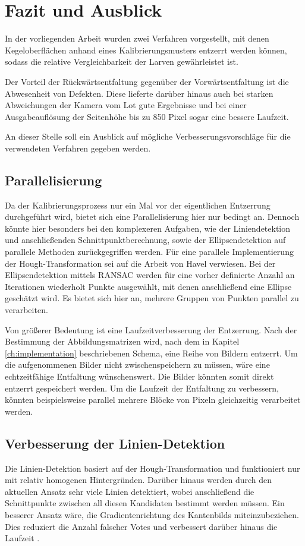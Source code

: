 \chapter{Fazit und Ausblick}
\label{ch:summary}
In der vorliegenden Arbeit wurden zwei Verfahren vorgestellt, mit denen Kegeloberflächen anhand eines Kalibrierungsmusters entzerrt werden können, sodass die relative Vergleichbarkeit der Larven gewährleistet ist.

Der Vorteil der Rückwärtsentfaltung gegenüber der Vorwärtsentfaltung ist die Abwesenheit von Defekten. Diese lieferte darüber hinaus auch bei starken Abweichungen der Kamera vom Lot gute Ergebnisse und bei einer Ausgabeauflösung der Seitenhöhe bis zu 850 Pixel sogar eine bessere Laufzeit.

An dieser Stelle soll ein Ausblick auf mögliche Verbesserungsvorschläge für die verwendeten Verfahren gegeben werden.

\section{Parallelisierung}
Da der Kalibrierungsprozess nur ein Mal vor der eigentlichen Entzerrung durchgeführt wird, bietet sich eine Parallelisierung hier nur bedingt an.
Dennoch könnte hier besonders bei den komplexeren Aufgaben, wie der Liniendetektion und anschließenden Schnittpunktberechnung, sowie der Ellipsendetektion auf parallele Methoden zurückgegriffen werden.
Für eine parallele Implementierung der Hough-Transformation sei auf die Arbeit von Havel \cite{Havel2014} verwiesen.
Bei der Ellipsendetektion mittels RANSAC werden für eine vorher definierte Anzahl an Iterationen wiederholt Punkte ausgewählt, mit denen anschließend eine Ellipse geschätzt wird. Es bietet sich hier an, mehrere Gruppen von Punkten parallel zu verarbeiten.

Von größerer Bedeutung ist eine Laufzeitverbesserung der Entzerrung. Nach der Bestimmung der Abbildungsmatrizen wird, nach dem in Kapitel \ref{ch:implementation} beschriebenen Schema, eine Reihe von Bildern entzerrt. Um die aufgenommenen Bilder nicht zwischenspeichern zu müssen, wäre eine echtzeitfähige Entfaltung wünschenswert. Die Bilder könnten somit direkt entzerrt gespeichert werden.  Um die Laufzeit der Entfaltung zu verbessern, könnten beispielsweise parallel mehrere Blöcke von Pixeln gleichzeitig verarbeitet werden.


\section{Verbesserung der Linien-Detektion}
Die Linien-Detektion basiert auf der Hough-Transformation und funktioniert nur mit relativ homogenen Hintergründen. Darüber hinaus werden durch den aktuellen Ansatz sehr viele Linien detektiert, wobei anschließend die Schnittpunkte zwischen all diesen Kandidaten bestimmt werden müssen. Ein besserer Ansatz wäre, die Gradientenrichtung des Kantenbilds miteinzubeziehen. Dies reduziert die Anzahl falscher Votes und verbessert darüber hinaus die Laufzeit \cite{Gorman1976}.



